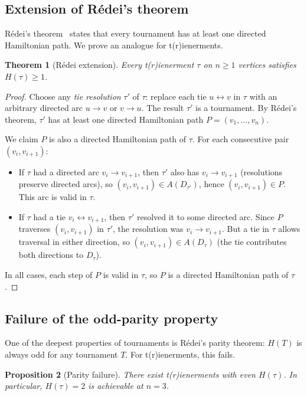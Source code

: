 \documentclass[12pt,reqno]{amsart}
\newtheorem{theorem}{Theorem}[section]
\newtheorem{proposition}[theorem]{Proposition}
\theoremstyle{definition}
\theoremstyle{plain}
\begin{document}
\subsection{Extension of R\'edei's theorem}

R\'edei's theorem~\cite{Redei1934} states that every tournament has at least one
directed Hamiltonian path.  We prove an analogue for t(r)ienerments.

\begin{theorem}[R\'edei extension]\label{thm:redei-ext}
Every t(r)ienerment $\tau$ on $n\ge 1$ vertices satisfies $H(\tau)\ge 1$.
\end{theorem}

\begin{proof}
Choose any \emph{tie resolution} $\tau'$ of $\tau$: replace each tie
$u\leftrightarrow v$ in $\tau$ with an arbitrary directed arc $u\to v$ or $v\to u$.
The result $\tau'$ is a tournament.  By R\'edei's theorem, $\tau'$ has at least
one directed Hamiltonian path $P=(v_1,\ldots,v_n)$.

We claim $P$ is also a directed Hamiltonian path of $\tau$.  For each
consecutive pair $(v_i,v_{i+1})$:
\begin{itemize}
\item If $\tau$ had a directed arc $v_i\to v_{i+1}$, then $\tau'$ also has
  $v_i\to v_{i+1}$ (resolutions preserve directed arcs), so
  $(v_i,v_{i+1})\in A(D_{\tau'})$, hence $(v_i,v_{i+1})\in P$.
  This arc is valid in $\tau$.
\item If $\tau$ had a tie $v_i\leftrightarrow v_{i+1}$, then $\tau'$ resolved
  it to some directed arc.  Since $P$ traverses $(v_i,v_{i+1})$ in $\tau'$,
  the resolution was $v_i\to v_{i+1}$.  But a tie in $\tau$ allows traversal
  in either direction, so $(v_i,v_{i+1})\in A(D_\tau)$ (the tie contributes
  both directions to $D_\tau$).
\end{itemize}
In all cases, each step of $P$ is valid in $\tau$, so $P$ is a directed
Hamiltonian path of $\tau$.
\end{proof}

\subsection{Failure of the odd-parity property}

One of the deepest properties of tournaments is R\'edei's parity theorem: $H(T)$
is always odd for any tournament $T$.  For t(r)ienerments, this fails.

\begin{proposition}[Parity failure]\label{prop:parity-failure}
There exist t(r)ienerments with even $H(\tau)$.  In particular, $H(\tau)=2$ is
achievable at $n=3$.
\end{proposition}
\end{document}
